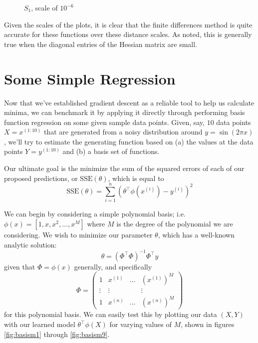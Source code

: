 \documentclass[10pt,letterpaper]{article}
\begin{document}
\begin{figure}[!htb]
  \caption{$S_1$, scale of $10^{-6}$}\label{fig:gradDifS}
\endminipage
\end{figure}

Given the scales of the plots, it is clear that the finite differences method is quite accurate for these functions over these distance scales. As noted, this is generally true when the diagonal entries of the Hessian matrix are small.

\section{Some Simple Regression}
Now that we've established gradient descent as a reliable tool to help us calculate minima, we can benchmark it by applying it directly through performing basis function regression on some given sample data points. Given, say, $10$ data points $X = x^{(1:10)}$ that are generated from a noisy distribution around $y = \sin(2\pi x)$, we'll try to estimate the generating function based on (a) the values at the data points $Y = y^{(1:10)}$ and (b) a basis set of functions.

Our ultimate goal is the minimize the sum of the squared errors of each of our proposed predictions, or $\text{SSE}(\theta)$, which is equal to
\[ \text{SSE}(\theta) = \sum_{i=1}^n (\theta^\intercal\phi(x^{(i)}) - y^{(i)})^2 \]

We can begin by considering a simple polynomial basis; i.e. $\phi(x) = [1, x, x^2, \ldots , x^M]$ where $M$ is the degree of the polynomial we are considering. We wish to minimize our parameter $\theta$, which has a well-known analytic solution:
\[ \theta = (\Phi^\intercal\Phi)^{-1}\Phi^\intercal y \]
given that $\Phi = \phi(x)$ generally, and specifically
\[ \Phi = \left( \begin{array}{cccc}
 1 &  x^{(1)} & \ldots & (x^{(1)})^M \\
 \vdots & \vdots & & \vdots \\
 1 &  x^{(n)} & \ldots & (x^{(n)})^M \end{array} \right) \]
for this polynomial basis. We can easily test this by plotting our data $(X, Y)$ with our learned model $\theta^\intercal\phi(X)$ for varying values of $M$, shown in figures \ref{fig:basism1} through \ref{fig:basism9}.
\end{document}
